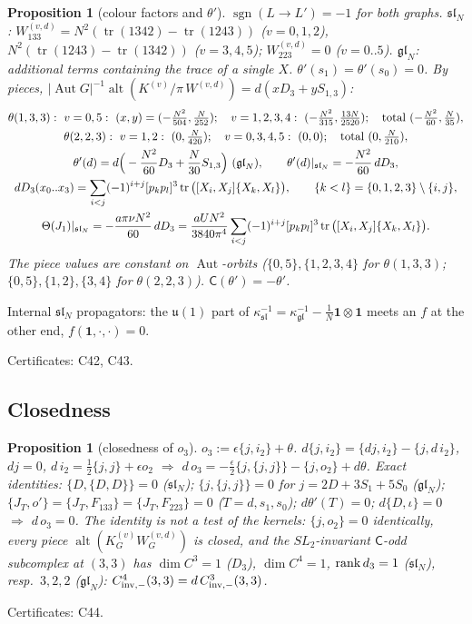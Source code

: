 \documentclass[10pt,a4paper]{article}
\numberwithin{equation}{section}
\newtheorem{proposition}[theorem]{Proposition}
\theoremstyle{definition}
\theoremstyle{remark}
\newcommand{\tr}{\operatorname{tr}}
\newcommand{\alt}{\operatorname{alt}}
\newcommand{\sgn}{\operatorname{sgn}}
\newcommand{\fsl}{\mathfrak{sl}}
\newcommand{\fgl}{\mathfrak{gl}}
\newcommand{\Aut}{\operatorname{Aut}}
\newcommand{\cert}[1]{\par\noindent\textup{Certificates: #1.}\par}
\newcommand{\Dthree}{D_3}
\begin{document}
\begin{proposition}[colour factors and $\theta'$]\label{prop-theta}
$\sgn(L\to L')=-1$ for both graphs. $\fsl_N$: $W^{(v,d)}_{133}=N^2(\tr(1342)-\tr(1243))$ ($v=0,1,2$), $N^2(\tr(1243)-\tr(1342))$ ($v=3,4,5$); $W^{(v,d)}_{223}=0$ ($v=0..5$). $\fgl_N$: additional terms containing the trace of a single $X$. $\theta'(s_1)=\theta'(s_0)=0$. By pieces, $|\Aut G|^{-1}\alt(K^{(v)}/\pi\,W^{(v,d)})=d(x\Dthree+yS_{1,3})$:
\begin{gather}
\theta(1,3,3):\ v=0,5:\ (x,y)=(-\tfrac{N^2}{504},\tfrac N{252});\quad v=1,2,3,4:\ (-\tfrac{N^2}{315},\tfrac{13N}{2520});\quad\text{total }(-\tfrac{N^2}{60},\tfrac N{35}),\notag\\
\theta(2,2,3):\ v=1,2:\ (0,\tfrac N{420});\quad v=0,3,4,5:\ (0,0);\quad\text{total }(0,\tfrac N{210}),\notag\\
\theta'(d)=d\Big(-\frac{N^2}{60}\Dthree+\frac N{30}S_{1,3}\Big)\ (\fgl_N),\qquad \theta'(d)|_{\fsl_N}=-\frac{N^2}{60}\,d\Dthree,\\
d\Dthree(x_0..x_3)=\sum_{i<j}(-1)^{i+j}[p_kp_l]^3\tr\big([X_i,X_j]\{X_k,X_l\}\big),\qquad\{k<l\}=\{0,1,2,3\}\setminus\{i,j\},\notag\\
\Theta(J_1)|_{\fsl_N}=-\frac{a\pi\nu N^2}{60}\,d\Dthree=\frac{aUN^2}{3840\pi^4}\sum_{i<j}(-1)^{i+j}[p_kp_l]^3\tr\big([X_i,X_j]\{X_k,X_l\}\big).\notag
\end{gather}
The piece values are constant on $\Aut$-orbits ($\{0,5\},\{1,2,3,4\}$ for $\theta(1,3,3)$; $\{0,5\},\{1,2\},\{3,4\}$ for $\theta(2,2,3)$). $\mathsf C(\theta')=-\theta'$.
\end{proposition}
Internal $\fsl_N$ propagators: the $\mathfrak u(1)$ part of $\kappa^{-1}_{\fsl}=\kappa^{-1}_{\fgl}-\frac1N\mathbf1\otimes\mathbf1$ meets an $f$ at the other end, $f(\mathbf1,\cdot,\cdot)=0$.
\cert{C42, C43}

\subsection{Closedness}

\begin{proposition}[closedness of $o_3$]\label{prop-o3closed}
$o_3:=\epsilon\{j,i_2\}+\theta$. $d\{j,i_2\}=\{dj,i_2\}-\{j,d\,i_2\}$, $dj=0$, $d\,i_2=\frac12\{j,j\}+\epsilon o_2$ $\Rightarrow$ $d\,o_3=-\frac\epsilon2\{j,\{j,j\}\}-\{j,o_2\}+d\theta$. Exact identities: $\{D,\{D,D\}\}=0$ ($\fsl_N$); $\{j,\{j,j\}\}=0$ for $j=2D+3S_1+5S_0$ ($\fgl_N$); $\{J_T,o'\}=\{J_T,F_{133}\}=\{J_T,F_{223}\}=0$ ($T=d,s_1,s_0$); $d\theta'(T)=0$; $d\{D,\iota\}=0$ $\Rightarrow$ $d\,o_3=0$. The identity is not a test of the kernels: $\{j,o_2\}=0$ identically, every piece $\alt(K^{(v)}_GW^{(v,d)}_G)$ is closed, and the $SL_2$-invariant $\mathsf C$-odd subcomplex at $(3,3)$ has $\dim C^3=1$ ($\Dthree$), $\dim C^4=1$, ${\rm rank}\,d_3=1$ ($\fsl_N$), resp.\ $3,2,2$ ($\fgl_N$): $C^4_{{\rm inv},-}(3,3)=d\,C^3_{{\rm inv},-}(3,3)$.
\end{proposition}
\cert{C44}
\end{document}
